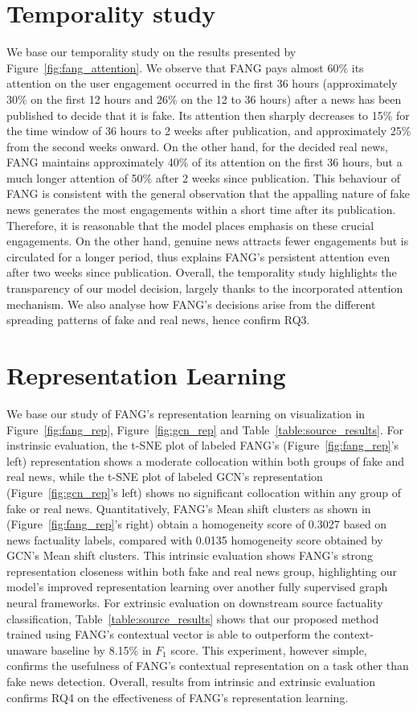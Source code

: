 \documentclass[fyp]{socreport}
\theoremstyle{definition}
\theoremstyle{hypothesis}
\begin{document}
\section{Temporality study}
We base our temporality study on the results presented by Figure~\ref{fig:fang_attention}. We observe that FANG pays almost 60\% its attention on the user engagement occurred in the first 36 hours (approximately 30\% on the first 12 hours and 26\% on the 12 to 36 hours) after a news has been published to decide that it is fake. Its attention then sharply decreases to 15\% for the time window of 36 hours to 2 weeks after publication, and approximately 25\% from the second weeks onward. On the other hand, for the decided real news, FANG maintains approximately 40\% of its attention on the first 36 hours, but a much longer attention of 50\% after 2 weeks since publication. This behaviour of FANG is consistent with the general observation that the appalling nature of fake news generates the most engagements within a short time after its publication. Therefore, it is reasonable that the model places emphasis on these crucial engagements. On the other hand, genuine news attracts fewer engagements but is circulated for a longer period, thus explains FANG's persistent attention even after two weeks since publication. Overall, the temporality study highlights the transparency of our model decision, largely thanks to the incorporated attention mechanism. We also analyse how FANG's decisions arise from the different spreading patterns of fake and real news, hence confirm RQ3.

\section{Representation Learning}
We base our study of FANG's representation learning on visualization in Figure~\ref{fig:fang_rep}, Figure~\ref{fig:gcn_rep} and Table~\ref{table:source_results}. For instrinsic evaluation, the t-SNE plot of labeled FANG's (Figure~\ref{fig:fang_rep}'s left) representation shows a moderate collocation within both groups of fake and real news, while the t-SNE plot of labeled GCN's representation (Figure~\ref{fig:gcn_rep}'s left) shows no significant collocation within any group of fake or real news. Quantitatively, FANG's Mean shift clusters as shown in (Figure~\ref{fig:fang_rep}'s right) obtain a homogeneity score of 0.3027 based on news factuality labels, compared with 0.0135 homogeneity score obtained by GCN's Mean shift clusters. This intrinsic evaluation shows FANG's strong representation closeness within both fake and real news group, highlighting our model's improved representation learning over another fully supervised graph neural frameworks. For extrinsic evaluation on downstream source factuality classification, Table~\ref{table:source_results} shows that our proposed method trained using FANG's contextual vector is able to outperform the context-unaware baseline by 8.15\% in $F_1$ score. This experiment, however simple, confirms the usefulness of FANG's contextual representation on a task other than fake news detection. Overall, results from intrinsic and extrinsic evaluation confirms RQ4 on the effectiveness of FANG's representation learning.
\end{document}
